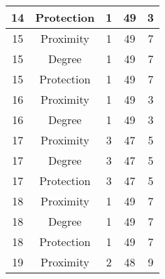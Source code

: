 \documentclass[results.tex]{subfiles}
\begin{document}
\begin{center}
\begin{tabular}{| c || c | c | c | c |}
            \hline
            14                      & Protection                   & 1                      & 49                      & 3                    \\
            \hline
            15                      & Proximity                    & 1                      & 49                      & 7                    \\
            \hline
            15                      & Degree                       & 1                      & 49                      & 7                    \\
            \hline
            15                      & Protection                   & 1                      & 49                      & 7                    \\
            \hline
            16                      & Proximity                    & 1                      & 49                      & 3                    \\
            \hline
            16                      & Degree                       & 1                      & 49                      & 3                    \\
            \hline
            17                      & Proximity                    & 3                      & 47                      & 5                    \\
            \hline
            17                      & Degree                       & 3                      & 47                      & 5                    \\
            \hline
            17                      & Protection                   & 3                      & 47                      & 5                    \\
            \hline
            18                      & Proximity                    & 1                      & 49                      & 7                    \\
            \hline
            18                      & Degree                       & 1                      & 49                      & 7                    \\
            \hline
            18                      & Protection                   & 1                      & 49                      & 7                    \\
            \hline
            19                      & Proximity                    & 2                      & 48                      & 9                    \\

\end{tabular}
\end{center}
\end{document}
